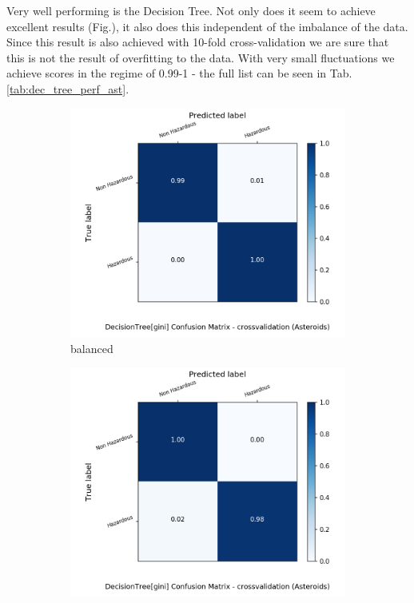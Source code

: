 \documentclass{article}
\begin{document}
Very well performing is the Decision Tree. Not only does it seem to achieve excellent results (Fig.), it also does this independent of the imbalance of the data. Since this result is also achieved with 10-fold cross-validation we are sure that this is not the result of overfitting to the data. With very small fluctuations we achieve scores in the regime of 0.99-1 - the full list can be seen in Tab.\ref{tab:dec_tree_perf_ast}.


\begin{figure}[h!]
	\centering
	\begin{subfigure}{.5\textwidth}
		\centering
		\includegraphics[width=1.1\textwidth]{Plots/asteroids/asteroids_DecisionTree_gini_balance_True_crossvalidation.png}
		\caption{balanced}
	\end{subfigure}%
	\begin{subfigure}{.5\textwidth}
		\centering
		\includegraphics[width=1.1\textwidth]{Plots/asteroids/asteroids_DecisionTree_gini_balance_False_crossvalidation.png}

\end{subfigure}
\end{figure}
\end{document}
